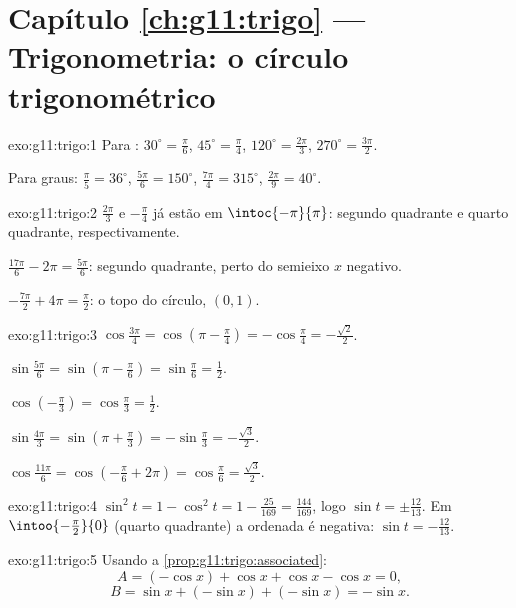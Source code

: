 \section*{Capítulo \ref{ch:g11:trigo} --- Trigonometria: o círculo trigonométrico}

\begin{solution}{exo:g11:trigo:1}
Para : $30^\circ = \frac{\pi}{6}$, $45^\circ = \frac{\pi}{4}$,
$120^\circ = \frac{2\pi}{3}$, $270^\circ = \frac{3\pi}{2}$.

Para graus: $\frac{\pi}{5} = 36^\circ$, $\frac{5\pi}{6} = 150^\circ$,
$\frac{7\pi}{4} = 315^\circ$, $\frac{2\pi}{9} = 40^\circ$.
\end{solution}

\begin{solution}{exo:g11:trigo:2}
$\frac{2\pi}{3}$ e $-\frac{\pi}{4}$ já estão em $\intoc{-\pi}{\pi}$:
segundo quadrante e quarto quadrante, respectivamente.

$\frac{17\pi}{6} - 2\pi = \frac{5\pi}{6}$: segundo quadrante, perto do
semieixo $x$ negativo.

$-\frac{7\pi}{2} + 4\pi = \frac{\pi}{2}$: o topo do círculo, $(0, 1)$.
\end{solution}

\begin{solution}{exo:g11:trigo:3}
$\cos\frac{3\pi}{4} = \cos\left(\pi - \frac\pi4\right)
= -\cos\frac\pi4 = -\frac{\sqrt2}{2}$.

$\sin\frac{5\pi}{6} = \sin\left(\pi - \frac\pi6\right)
= \sin\frac\pi6 = \frac12$.

$\cos\left(-\frac\pi3\right) = \cos\frac\pi3 = \frac12$.

$\sin\frac{4\pi}{3} = \sin\left(\pi + \frac\pi3\right)
= -\sin\frac\pi3 = -\frac{\sqrt3}{2}$.

$\cos\frac{11\pi}{6} = \cos\left(-\frac\pi6 + 2\pi\right)
= \cos\frac\pi6 = \frac{\sqrt3}{2}$.
\end{solution}

\begin{solution}{exo:g11:trigo:4}
$\sin^2 t = 1 - \cos^2 t = 1 - \frac{25}{169} = \frac{144}{169}$, logo
$\sin t = \pm\frac{12}{13}$. Em $\intoo{-\frac\pi2}{0}$ (quarto
quadrante) a ordenada é negativa: $\sin t = -\frac{12}{13}$.
\end{solution}

\begin{solution}{exo:g11:trigo:5}
Usando a \cref{prop:g11:trigo:associated}:
\[
A = (-\cos x) + \cos x + \cos x - \cos x = 0 ,
\]
\[
B = \sin x + (-\sin x) + (-\sin x) = -\sin x .
\]
\end{solution}

